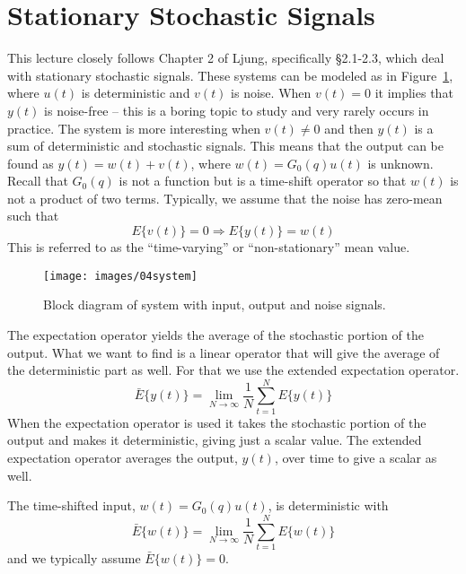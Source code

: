 \mainmatter%
\setcounter{page}{1}

\lectureseries[\course]{\course}

\date{October 6, 2009}

\setaddress%

\setcounter{lecture}{3}
\setcounter{chapter}{3}


\section{Stationary Stochastic Signals}
This lecture closely follows Chapter 2 of Ljung, specifically \S2.1-2.3, which deal with stationary stochastic signals.%
These systems can be modeled as in Figure~\ref{fig:04system}, where $u(t)$ is deterministic and $v(t)$ is noise.
When $v(t)=0$ it implies that $y(t)$ is noise-free -- this is a boring topic to study and very rarely occurs in practice.%
The system is more interesting when $v(t)\neq 0$ and then $y(t)$ is a sum of deterministic and stochastic signals.
This means that the output can be found as $y(t)=w(t)+v(t)$, where $w(t)=G_0(q)u(t)$ is unknown.
Recall that $G_0(q)$ is not a function but is a time-shift operator so that $w(t)$ is not a product of two terms.
Typically, we assume that the noise has zero-mean such that
$$E\{v(t)\}=0 \Rightarrow E\{y(t)\}=w(t)$$
This is referred to as the ``time-varying'' or ``non-stationary'' mean value.
\begin{figure}[ht!]
\centering
\texttt{[image: images/04system]}
\caption{Block diagram of system with input, output and noise signals.}
\label{fig:04system}
\end{figure}

The expectation operator yields the average of the stochastic portion of the output.
What we want to find is a linear operator that will give the average of the deterministic part as well.
For that we use the extended expectation operator.
$$\bar{E}\{y(t)\} = \lim_{N\to\infty}\frac{1}{N}\sum_{t=1}^N E\{y(t)\}$$
When the expectation operator is used it takes the stochastic portion of the output and makes it deterministic, giving just a scalar value.
The extended expectation operator averages the output, $y(t)$, over time to give a scalar as well.

The time-shifted input, $w(t)=G_0(q)u(t)$, is deterministic with
$$\bar{E}\{w(t)\} = \lim_{N\to\infty}\frac{1}{N}\sum_{t=1}^N E\{w(t)\}$$
and we typically assume $\bar{E}\{w(t)\}=0$.

